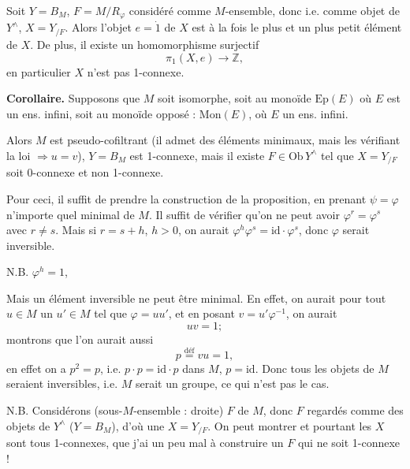 \documentclass[11pt,a4paper]{article}
\begin{document}
Soit $Y = B_M$, $F = M/R_\varphi$ considéré comme $M$-ensemble, donc i.e. comme
objet de $Y^\wedge$, $X = Y_{/F}$. Alors l'objet $e = \dot{1}$ de $X$ est à la
fois le plus   et un plus petit élément de $X$. De plus,
 il existe un homomorphisme surjectif
\[
  \pi_1(X,e) \longrightarrow \mathbb{Z} ,
\]
en particulier $X$ n'est pas 1-connexe.


\textbf{Corollaire.} Supposons que $M$ soit \struck{\ill{}} isomorphe, soit au
monoïde $\mathrm{Ep}(E)$ où $E$ est un ens. infini, soit au monoïde opposé :
$\mathrm{Mon}(E)$, où $E$ un ens. \ill{} infini.


Alors $M$ est pseudo-cofiltrant \struck{\ill{}} (il admet \struck{\ill{}} des
éléments minimaux, mais les \ill{} vérifiant la loi 
$\Longrightarrow u = v$), $Y = B_M$ est 1-connexe, mais il existe
$F \in \mathrm{Ob}\,Y^\wedge$ tel que $X = Y_{/F}$ soit 0-connexe et non
1-connexe.

Pour ceci, il suffit de prendre  la construction de la proposition,
en prenant  $\psi = \varphi$ n'importe quel 
minimal de $M$. Il suffit de vérifier qu'on ne peut avoir
$\varphi^{r} = \varphi^{s}$ avec $r \ne s$. Mais si $r = s+h$, $h > 0$, on aurait
$\varphi^{h}\varphi^{s} = \mathrm{id}\cdot\varphi^{s}$, donc $\varphi$ serait
inversible.


N.B. $\varphi^{h} = 1$,


Mais un élément inversible ne peut être minimal. En effet, on aurait pour tout
$u \in M$ un $u' \in M$ tel que $\varphi = uu'$, \struck{\ill{}} et en posant
$v = u'\varphi^{-1}$, on aurait
\[
  uv = 1 ;
\]
montrons que l'on aurait aussi
\[
  p \overset{\text{déf}}{=} vu = 1 ,
\]
en effet on a $p^{2} = p$, i.e. $p\cdot p = \mathrm{id}\cdot p$ dans \ill{} $M$,
$p = \mathrm{id}$. Donc tous les objets de $M$ seraient inversibles, i.e. $M$
serait un groupe, ce qui n'est pas le cas.

N.B. Considérons \struck{\ill{}}  (sous-$M$-ensemble :
\struck{\ill{}}  droite) $F$ de $M$, donc $F$ \ill{} regardés
comme des objets de $Y^\wedge$ ($Y = B_M$), d'où une \ill{} $X = Y_{/F}$. On peut
montrer \ill{} et pourtant les $X$ sont tous 1-connexes, \ill{} que j'ai un peu
\ill{} mal à construire un $F$ \struck{\ill{}}  qui ne soit
1-connexe !
\end{document}
